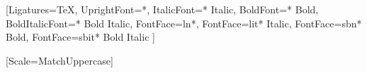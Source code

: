 \usepackage[margin=0.5in]{geometry}
\usepackage{calc}

\usepackage{fontspec}
\setmainfont{Times New Roman}
  [Ligatures=TeX,
   UprightFont=*,
   ItalicFont={* Italic},
   BoldFont={* Bold},
   BoldItalicFont={* Bold Italic},
   FontFace={l}{n}{*},
   FontFace={l}{it}{* Italic},
   FontFace={sb}{n}{* Bold},
   FontFace={sb}{it}{* Bold Italic}
  ]
\DeclareRobustCommand{\ltseries}{\fontseries{l}\selectfont}
\DeclareTextFontCommand{\textlt}{\ltseries}
\DeclareRobustCommand{\sbseries}{\fontseries{sb}\selectfont}
\DeclareTextFontCommand{\textsb}{\sbseries}

\setmonofont{Source Code Pro}[Scale=MatchUppercase]

\usepackage[dvipsnames]{xcolor}

\usepackage{titling}
\setlength{\droptitle}{-3.5em}
\pretitle{\vspace{0.25in}\begin{center}\rmfamily\bfseries\color{themecolour}}
\posttitle{\par\end{center}\vspace{-2em}}
\preauthor{}
\author{}
\postauthor{}
\predate{}
\date{}
\postdate{}

\setlength{\defaultparindent}{\parindent}
\setlength{\parindent}{0em}
\setlength{\defaultparskip}{\parskip}
\setlength{\parskip}{1ex}

\usepackage[titles]{tocloft}
\setlength{\cftaftertoctitleskip}{1\parskip}
\setlength{\cftbeforesecskip}{0.5\parskip}
\setlength{\cftsecindent}{0pt}
\setlength{\cftsubsecindent}{1.5em}
\setlength{\cftsubsubsecindent}{1.5em}
\renewcommand{\cfttoctitlefont}{\LARGE\rmfamily\bfseries\color{themecolour}}
\renewcommand{\cftsecfont}{\normalsize\rmfamily}
\renewcommand{\cftsecpagefont}{\normalsize\rmfamily}
\renewcommand{\cftsubsecfont}{\normalsize\rmfamily\ltseries}
\renewcommand{\cftsubsecpagefont}{\normalsize\rmfamily\ltseries}
\renewcommand{\cftsubsubsecfont}{\normalsize\rmfamily\ltseries\itshape}
\renewcommand{\cftsubsubsecpagefont}{\normalsize\rmfamily\ltseries\itshape}

